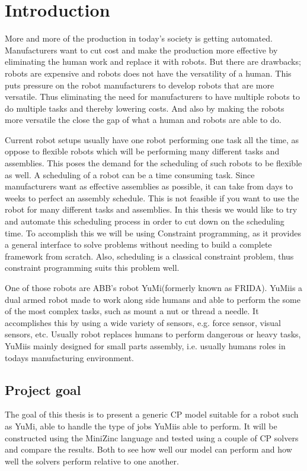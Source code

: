 \chapter{Introduction} 

More and more of the production in today's society is getting automated. Manufacturers want to cut cost and make the production more effective by eliminating the human work and replace it with robots. But there are drawbacks; robots are expensive and robots does not have the versatility of a human. This puts pressure on the robot manufacturers to develop robots that are more versatile. Thus eliminating the need for manufacturers to have multiple robots to do multiple tasks and thereby lowering costs. And also by making the robots more versatile the close the gap of what a human and robots are able to do.

Current robot setups usually have one robot performing one task all the time, as oppose to flexible robots which will be performing many different tasks and assemblies. This poses the demand for the scheduling of such robots to be flexible as well. A scheduling of a robot can be a time consuming task. Since manufacturers want as effective assemblies as possible, it can take from days to weeks to perfect an assembly schedule. This is not feasible if you want to use the robot for many different tasks and assemblies. In this thesis we would like to try and automate this scheduling process in order to cut down on the scheduling time. To accomplish this we will be using Constraint programming, as it provides a general interface to solve problems without needing to build a complete framework from scratch. Also, scheduling is a classical constraint problem, thus constraint programming suits this problem well.

One of those robots are ABB's robot YuMi\textsuperscript\textregistered(formerly known as FRIDA). YuMi\textsuperscript\textregistered is a dual armed robot made to work along side humans and able to perform the some of the most complex tasks, such as mount a nut or thread a needle.\cite{_yumi_} It accomplishes this by using a wide variety of sensors, e.g. force sensor, visual sensors, etc. Usually robot replaces humans to perform dangerous or heavy tasks, YuMi\textsuperscript\textregistered is mainly designed for small parts assembly, i.e. usually humans roles in todays manufacturing environment.



\section{Project goal}
The goal of this thesis is to present a generic CP model suitable for a robot such as YuMi\textsuperscript\textregistered, able to handle the type of jobs YuMi\textsuperscript\textregistered is able to perform. It will be constructed using the MiniZinc language and tested using a couple of CP solvers and compare the results. Both to see how well our model can perform and how well the solvers perform relative to one another.

